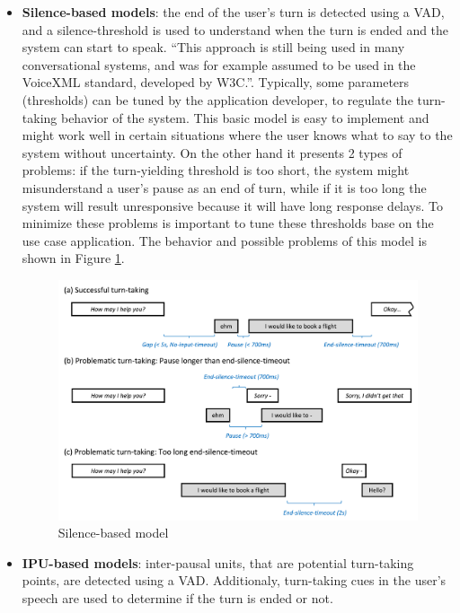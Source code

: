 \documentclass[../main.tex]{subfiles}
\begin{document}
\begin{itemize}
\item \textbf{Silence-based models}: the end of the user’s turn is detected using a VAD, and a silence-threshold is used to understand when the turn is ended and the system can start to speak. “This approach is still being used in many conversational systems, and was for example assumed to be used in the VoiceXML standard, developed by W3C.”. Typically, some parameters (thresholds) can be tuned by the application developer, to regulate the turn-taking behavior of the system.
This basic model is easy to implement and might work well in certain situations where the user knows what to say to the system without uncertainty. On the other hand it presents 2 types of problems: if the turn-yielding threshold is too short, the system might misunderstand a user’s pause as an end of turn, while if it is too long the system will result unresponsive because it will have long response delays. To minimize these problems is important to tune these thresholds base on the use case application. The behavior and possible problems of this model is shown in Figure \ref{fig:silence-based}.

\begin{figure}[ht]
    \centering
    \includegraphics[width=\textwidth]{images/Silence-based model.png}
    \caption{Silence-based model \cite{skantze2021turn}}
    \label{fig:silence-based}
\end{figure}

\item \textbf{IPU-based models}: inter-pausal units, that are potential turn-taking points, are detected using a VAD. Additionaly, turn-taking cues in the user's speech are used to determine if the turn is ended or not. 


\end{itemize}
\end{document}
